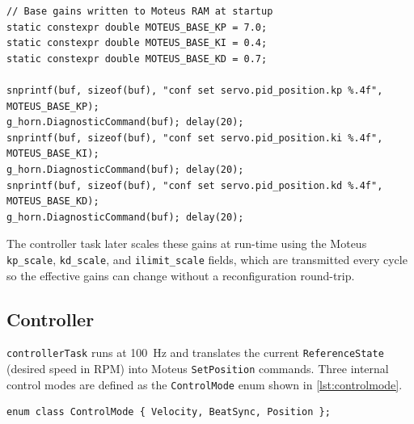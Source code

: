 \begin{listing}[H]
	\begin{verbatim}
// Base gains written to Moteus RAM at startup
static constexpr double MOTEUS_BASE_KP = 7.0;
static constexpr double MOTEUS_BASE_KI = 0.4;
static constexpr double MOTEUS_BASE_KD = 0.7;

snprintf(buf, sizeof(buf), "conf set servo.pid_position.kp %.4f", MOTEUS_BASE_KP);
g_horn.DiagnosticCommand(buf); delay(20);
snprintf(buf, sizeof(buf), "conf set servo.pid_position.ki %.4f", MOTEUS_BASE_KI);
g_horn.DiagnosticCommand(buf); delay(20);
snprintf(buf, sizeof(buf), "conf set servo.pid_position.kd %.4f", MOTEUS_BASE_KD);
g_horn.DiagnosticCommand(buf); delay(20);
\end{verbatim}
	\caption{Base PID gain configuration sent to the Moteus at startup via diagnostic commands.}
	\label{lst:moteus-pid}
\end{listing}

The controller task later scales these gains at run-time using the Moteus
\texttt{kp\_scale}, \texttt{kd\_scale}, and \texttt{ilimit\_scale} fields,
which are transmitted every cycle so the effective gains can change without a reconfiguration round-trip.

\subsection{Controller}
\texttt{controllerTask} runs at 100~Hz and translates the current \texttt{ReferenceState}
(desired speed in RPM) into Moteus \texttt{SetPosition} commands.
Three internal control modes are defined as the \texttt{ControlMode} enum shown in \autoref{lst:controlmode}.

\begin{listing}[H]
	\begin{verbatim}
enum class ControlMode { Velocity, BeatSync, Position };
\end{verbatim}
	\caption{\texttt{ControlMode} enum defining the three operating states of the controller.}
	\label{lst:controlmode}
\end{listing}

